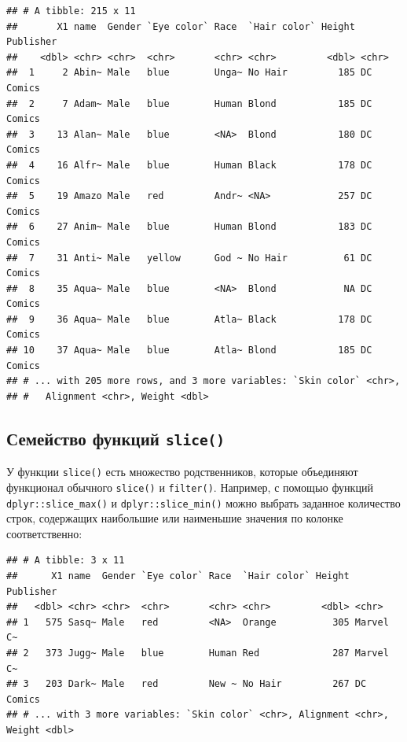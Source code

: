 \documentclass[]{book}
\newenvironment{Shaded}{\begin{snugshade}}{\end{snugshade}}
\newcommand{\KeywordTok}[1]{\textcolor[rgb]{0.13,0.29,0.53}{\textbf{#1}}}
\newcommand{\DataTypeTok}[1]{\textcolor[rgb]{0.13,0.29,0.53}{#1}}
\newcommand{\DecValTok}[1]{\textcolor[rgb]{0.00,0.00,0.81}{#1}}
\newcommand{\StringTok}[1]{\textcolor[rgb]{0.31,0.60,0.02}{#1}}
\newcommand{\OperatorTok}[1]{\textcolor[rgb]{0.81,0.36,0.00}{\textbf{#1}}}
\newcommand{\NormalTok}[1]{#1}
\begin{document}
\begin{verbatim}
## # A tibble: 215 x 11
##       X1 name  Gender `Eye color` Race  `Hair color` Height Publisher
##    <dbl> <chr> <chr>  <chr>       <chr> <chr>         <dbl> <chr>    
##  1     2 Abin~ Male   blue        Unga~ No Hair         185 DC Comics
##  2     7 Adam~ Male   blue        Human Blond           185 DC Comics
##  3    13 Alan~ Male   blue        <NA>  Blond           180 DC Comics
##  4    16 Alfr~ Male   blue        Human Black           178 DC Comics
##  5    19 Amazo Male   red         Andr~ <NA>            257 DC Comics
##  6    27 Anim~ Male   blue        Human Blond           183 DC Comics
##  7    31 Anti~ Male   yellow      God ~ No Hair          61 DC Comics
##  8    35 Aqua~ Male   blue        <NA>  Blond            NA DC Comics
##  9    36 Aqua~ Male   blue        Atla~ Black           178 DC Comics
## 10    37 Aqua~ Male   blue        Atla~ Blond           185 DC Comics
## # ... with 205 more rows, and 3 more variables: `Skin color` <chr>,
## #   Alignment <chr>, Weight <dbl>
\end{verbatim}

\subsection{\texorpdfstring{Семейство функций
\texttt{slice()}}{Семейство функций slice()}}\label{slice_family}

У функции \texttt{slice()} есть множество родственников, которые
объединяют функционал обычного \texttt{slice()} и \texttt{filter()}.
Например, с помощью функций \texttt{dplyr::slice\_max()} и
\texttt{dplyr::slice\_min()} можно выбрать заданное количество строк,
содержащих наибольшие или наименьшие значения по колонке соответственно:

\begin{Shaded}
\end{Shaded}

\begin{verbatim}
## # A tibble: 3 x 11
##      X1 name  Gender `Eye color` Race  `Hair color` Height Publisher
##   <dbl> <chr> <chr>  <chr>       <chr> <chr>         <dbl> <chr>    
## 1   575 Sasq~ Male   red         <NA>  Orange          305 Marvel C~
## 2   373 Jugg~ Male   blue        Human Red             287 Marvel C~
## 3   203 Dark~ Male   red         New ~ No Hair         267 DC Comics
## # ... with 3 more variables: `Skin color` <chr>, Alignment <chr>, Weight <dbl>
\end{verbatim}
\end{document}
